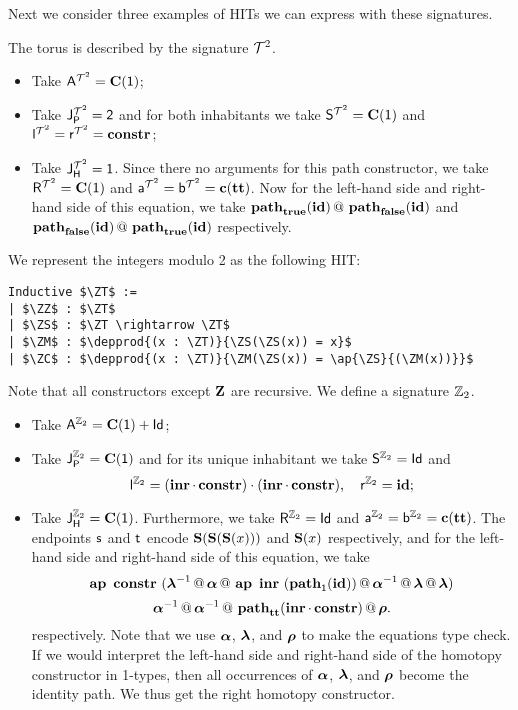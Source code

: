 Next we consider three examples of HITs we can express with these signatures.

\begin{example}
\label{ex:torus}
The torus is described by the signature $\torus$.
\begin{itemize}
	\item Take $\pointconstr[\torus] = \constantP{\unit}$;
	\item Take $\pathlabel[\torus] = \bool$ and for both inhabitants we take $\patharg[\torus] = \constantP{\unit}$ and $\pathleft[\torus] = \pathright[\torus] = \constr$;
	\item Take $\homotlabel[\torus] = \unit$.
	Since there no arguments for this path constructor, we take $\homotpointarg[\torus] = \constantP{\unit}$ and $\pathargleft[\torus] = \pathargright[\torus] = \Ce(\unitt)$.
	Now for the left-hand side and right-hand side of this equation, we take $\hconcat{\hconstr{\booltrue}{\idENA}}{\hconstr{\boolfalse}{\idENA}}$ and $\hconcat{\hconstr{\boolfalse}{\idENA}}{\hconstr{\booltrue}{\idENA}}$ respectively. 
\end{itemize}
\end{example}

\begin{example}
\label{ex:mod}
We represent the integers modulo 2 as the following HIT:
\begin{lstlisting}[mathescape=true]
Inductive $\ZT$ :=
| $\ZZ$ : $\ZT$
| $\ZS$ : $\ZT \rightarrow \ZT$
| $\ZM$ : $\depprod{(x : \ZT)}{\ZS(\ZS(x)) = x}$
| $\ZC$ : $\depprod{(x : \ZT)}{\ZM(\ZS(x)) = \ap{\ZS}{(\ZM(x))}}$
\end{lstlisting}
Note that all constructors except $\ZZ$ are recursive.
We define a signature $\ZT$.
\begin{itemize}
	\item Take $\pointconstr[\ZT] = \sumP{\constantP{\unit}}{\idP}$;
	\item Take $\pathlabel[\ZT] = \constantP{\unit}$ and for its unique inhabitant we take $\patharg[\ZT] = \idP$ and
	\[
	\pathleft[\ZT] = \comp{(\comp{\inre}{\constr})}{(\comp{\inre}{\constr})}, \quad
	\pathright[\ZT] = \idENA;
	\]
	\item Take $\homotlabel[\ZT] = \constantP{\unit}$.
	Furthermore, we take $\homotpointarg[\ZT] = \idP$ and $\pathargleft[\ZT] = \pathargright[\ZT] = \Ce(\unitt)$.
	The endpoints $\homotpathleft$ and $\homotpathright$ encode $\ZS(\ZS(\ZS(x)))$ and $\ZS(x)$ respectively,
	and for the left-hand side and right-hand side of this equation, we take
	\[
	\hap{\constr}{(\hconcat{\hinv{\hlunitN}}{\hconcat{\hassocN}{\hconcat{\hap{\inre}{(\hconstr{\unit}{\idENA})}}{\hconcat{\hinv{\hassocN}}{\hconcat{\hlunitN}{\hlunitN}}}}})}
	\]
	\[
	\hconcat{\hinv{\hassocN}}{\hconcat{\hinv{\hassocN}}{\hconcat{\hconstr{\unitt}{\comp{\inre}{\constr}}}{\hrunitN}}}.
	\]
	respectively.
	Note that we use $\hassocN$, $\hlunitN$, and $\hrunitN$ to make the equations type check.
	If we would interpret the left-hand side and right-hand side of  the homotopy constructor in 1-types,
	then all occurrences of $\hassocN$, $\hlunitN$, and $\hrunitN$ become the identity path.
	We thus get the right homotopy constructor.
\end{itemize}
\end{example}

